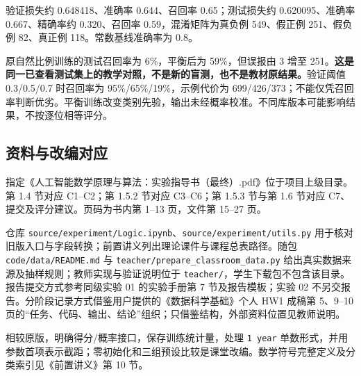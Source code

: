 \documentclass[UTF8,a4paper,11pt,fontset=fandol]{ctexart}
\newcommand{\file}[1]{\nolinkurl{#1}}
\begin{document}
验证损失约 0.648418、准确率 0.644、召回率 0.65；测试损失约 0.620095、准确率 0.667、精确率约 0.320、召回率 0.59，混淆矩阵为真负例 549、假正例 251、假负例 82、真正例 118。常数基线准确率为 0.8。

原自然比例训练的测试召回率为 6\%，平衡后为 59\%，但误报由 3 增至 251。\textbf{这是同一已查看测试集上的教学对照，不是新的盲测，也不是教材原结果。}验证阈值 0.3/0.5/0.7 时召回率为 95\%/65\%/19\%，示例代价为 699/426/373；不能仅凭召回率判断优劣。平衡训练改变类别先验，输出未经概率校准。不同库版本可能影响结果，不按逐位相等评分。
\subsection{资料与改编对应}
指定《人工智能数学原理与算法：实验指导书（最终）.pdf》位于项目上级目录。第 1.4 节对应 C1--C2；第 1.5.2 节对应 C3--C6；第 1.5.3 节与第 1.6 节对应 C7、提交及评分建议。页码为书内第 1--13 页，文件第 15--27 页。

仓库 \file{source/experiment/Logic.ipynb}、\file{source/experiment/utils.py} 用于核对旧版入口与字段转换；前置讲义列出理论课件与课程总表路径。随包 \file{code/data/README.md} 与 \file{teacher/prepare_classroom_data.py} 给出真实数据来源及抽样规则；教师实现与验证说明位于 \file{teacher/}，学生下载包不包含该目录。报告提交方式参考同级实验 01 的实验手册第 7 节及报告模板；实验 02 不另交报告。分阶段记录方式借鉴用户提供的《数据科学基础》个人 HW1 成稿第 5、9--10 页的“任务、代码、输出、结论”组织；只借鉴结构，外部资料位置见教师说明。

相较原版，明确得分/概率接口，保存训练统计量，处理 \texttt{1 year} 单数形式，并用参数首项表示截距；零初始化和三组预设比较是课堂改编。数学符号完整定义及分类索引见《前置讲义》第 10 节。
\end{document}
